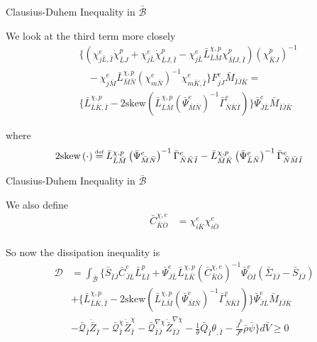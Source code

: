 \documentclass[11pt]{beamer}
\newcommand\defeq{\mathrel{\stackrel{\makebox[0pt]{\mbox{\normalfont\tiny def}}}{=}}}
\begin{document}
\begin{frame}{Clausius-Duhem Inequality in $\bar{\mathcal{B}}$}

We look at the third term more closely
\begin{align*}
&\bigg\{\left(\chi_{j\bar{L},\bar{I}}^e \dot{\chi}_{\bar{L}J}^p + \chi_{j\bar{L}}^e\dot{\chi}_{\bar{L}J,\bar{I}}^p - \chi_{j\bar{L}}^e\bar{L}_{\bar{L}\bar{M}}^{\chi,p}\chi_{\bar{M}J,\bar{I}}^p\right)\left(\chi_{\bar{K}J}^p\right)^{-1}\\
&\ \ \ \ -\chi_{j\bar{M}}^e \bar{L}_{\bar{M}\bar{N}}^{\chi,p} \left(\chi_{m\bar{N}}^e\right)^{-1} \chi_{m\bar{K},\bar{I}}^e\bigg\} F_{j\bar{J}}^e \bar{M}_{\bar{I}\bar{J}\bar{K}}=\\
&\bigg\{\bar{L}_{\bar{L}\bar{K},\bar{I}}^{\chi,p}-2\text{skew}\left(\bar{L}_{\bar{L}\bar{M}}^{\chi,p}\left(\bar{\Psi}_{\bar{M}\bar{N}}^e\right)^{-1} \bar{\Gamma}_{\bar{N}\bar{K}\bar{I}}^e\right)\bigg\}\bar{\Psi}_{\bar{J}\bar{L}}^e\bar{M}_{\bar{I}\bar{J}\bar{K}}
\end{align*}

where
\begin{align*}
2\text{skew}\left(\cdot\right) &\defeq \bar{L}_{\bar{L}\bar{M}}^{\chi,p}\left(\bar{\Psi}_{\bar{M}\bar{N}}^e\right)^{-1} \bar{\Gamma}_{\bar{N}\bar{K}\bar{I}}^e - \bar{L}_{\bar{M}\bar{K}}^{\chi,p}\left(\bar{\Psi}_{\bar{L}\bar{N}}^e\right)^{-1} \bar{\Gamma}_{\bar{N}\bar{M}\bar{I}}^e
\end{align*}

\end{frame}

\begin{frame}{Clausius-Duhem Inequality in $\bar{\mathcal{B}}$}

We also define
\begin{align*}
\bar{C}_{\bar{K}\bar{O}}^{\chi,e} &= \chi_{i\bar{K}}^e \chi_{i\bar{O}}^e\\
\end{align*}

So now the dissipation inequality is
\begin{align*}
\mathcal{D} &=  \int_{\bar{\mathcal{B}}} \bigg\{\bar{S}_{\bar{I}\bar{J}} \bar{C}_{\bar{J}\bar{L}}^e\bar{L}_{\bar{L}\bar{I}}^p + \bar{\Psi}_{\bar{J}\bar{L}}^e \bar{L}_{\bar{L}\bar{K}}^{\chi,p} \left(\bar{C}_{\bar{K}\bar{O}}^{\chi,e}\right)^{-1} \bar{\Psi}_{\bar{O}\bar{I}}^e \left(\bar{\Sigma}_{\bar{I}\bar{J}} - \bar{S}_{\bar{I}\bar{J}}\right)\\ &+ \bigg\{\bar{L}_{\bar{L}\bar{K},\bar{I}}^{\chi,p}-2\text{skew}\left(\bar{L}_{\bar{L}\bar{M}}^{\chi,p}\left(\bar{\Psi}_{\bar{M}\bar{N}}^e\right)^{-1} \bar{\Gamma}_{\bar{N}\bar{K}\bar{I}}^e\right)\bigg\}\bar{\Psi}_{\bar{J}\bar{L}}^e\bar{M}_{\bar{I}\bar{J}\bar{K}}\\
& - \bar{\mathcal{Q}}_{\bar{I}}\dot{\bar{Z}}_{\bar{I}} - \bar{\mathcal{Q}}_{\bar{I}}^{\chi}\dot{\bar{Z}}_{\bar{I}}^{\chi} - \bar{\mathcal{Q}}_{\bar{I}\bar{J}}^{\nabla\chi}\dot{\bar{Z}}_{\bar{I}\bar{J}}^{\nabla\chi}  - \frac{1}{\theta} \bar{Q}_{\bar{I}} \theta_{,\bar{I}} - \frac{\dot{J}^p}{J^p} \bar{\rho} \bar{\psi}\bigg\} d\bar{V}\geq 0\\
\end{align*}

\end{frame}
\end{document}
